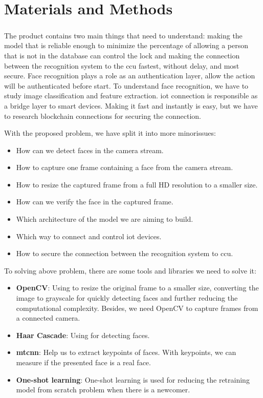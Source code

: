 \chapter{Materials and Methods}
\label{Materials and Methods}
\paragraph{}

The product contains two main things that need to understand: making the model that is reliable enough to minimize the percentage of allowing a person that is not in the database can control the lock and making the connection between the recognition system to the \acrshort{ccu} fastest, without delay, and most secure. Face recognition plays a role as an authentication layer, allow the action will be authenticated before start. To understand face recognition, we have to study image classification and feature extraction. \acrshort{iot} connection is responsible as a bridge layer to smart devices. Making it fast and instantly is easy, but we have to research blockchain connections for securing the connection.

With the proposed problem, we have split it into more minorissues:

\begin{itemize}
    \item How can we detect faces in the camera stream.
    \item How to capture one frame containing a face from the camera stream.
    \item How to resize the captured frame from a full HD resolution to a smaller size.
    \item How can we verify the face in the captured frame.
    \item Which architecture of the model we are aiming to build.
    \item Which way to connect and control \acrshort{iot} devices.
    \item How to secure the connection between the recognition system to \acrlong{ccu}.
\end{itemize}

To solving above problem, there are some tools and libraries we need to solve it:

\begin{itemize}
    \item \textbf{OpenCV}: Using to resize the original frame to a smaller size, converting the image to grayscale for quickly detecting faces and further reducing the computational complexity. Besides, we need OpenCV to capture frames from a connected camera.
    \item \textbf{Haar Cascade}: Using for detecting faces.
    \item \textbf{\acrlong{mtcnn}}: Help us to extract keypoints of faces. With keypoints, we can measure if the presented face is a real face.
    \item \textbf{One-shot learning}: One-shot learning is used for reducing the retraining model from scratch problem when there is a newcomer.
\end{itemize}

